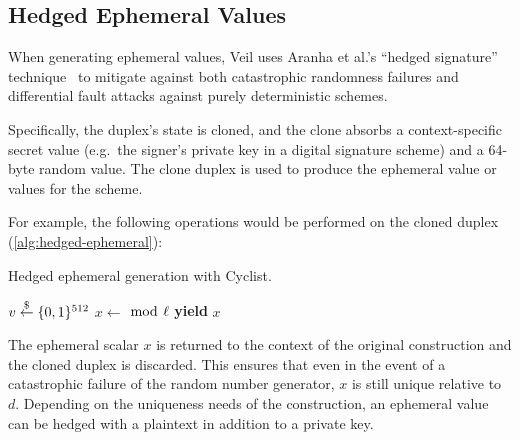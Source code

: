 \subsection{Hedged Ephemeral Values}\label{subsec:cons-hedged-ephemeral-values}

When generating ephemeral values, Veil uses Aranha et al.'s ``hedged signature''
technique~\cite{aranha2020} to mitigate against both catastrophic randomness failures and
differential fault attacks against purely deterministic schemes.

Specifically, the duplex's state is cloned, and the clone absorbs a context-specific secret value
(e.g.\ the signer's private key in a digital signature scheme) and a 64-byte random value. The clone
duplex is used to produce the ephemeral value or values for the scheme.

For example, the following operations would be performed on the cloned duplex
(\ref{alg:hedged-ephemeral}):

\begin{algorithm}
    \caption{Hedged ephemeral generation with Cyclist.}
    \begin{algorithmic}[0]
        \Clone {}
        \State {}
        \State $v \stackrel{\$}{\gets} \{0,1\}^{512}$
        \State {}
        \State $x \gets$  $\bmod~\ell$
        \State \textbf{yield} $x$
        \End {}
    \end{algorithmic}\label{alg:hedged-ephemeral}
\end{algorithm}

The ephemeral scalar $x$ is returned to the context of the original construction and the cloned
duplex is discarded. This ensures that even in the event of a catastrophic failure of the random
number generator, $x$ is still unique relative to $d$. Depending on the uniqueness needs of the
construction, an ephemeral value can be hedged with a plaintext in addition to a private key.
